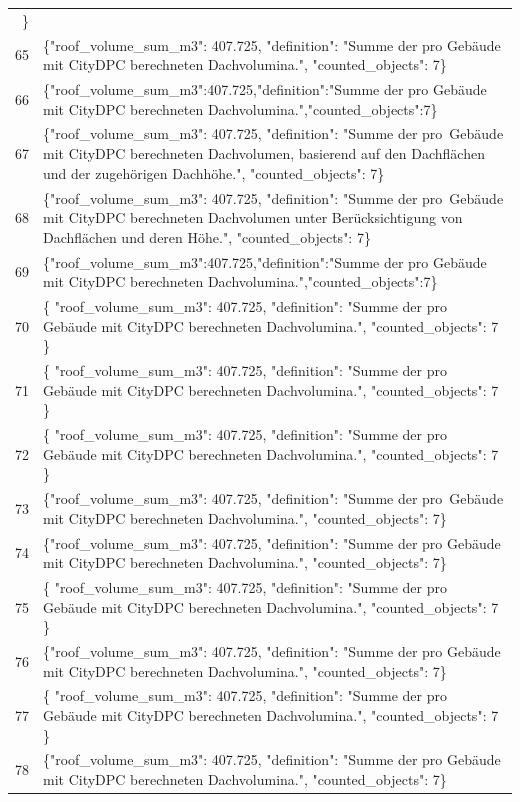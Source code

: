 \documentclass[a4paper,11pt]{article}
\begin{document}
\begin{table}[ht]
\begin{tabular}{r p{12cm}}
\} \\
65 & \{"roof\_volume\_sum\_m3": 407.725, "definition": "Summe der pro Gebäude mit CityDPC berechneten Dachvolumina.", "counted\_objects": 7\} \\
66 & \{"roof\_volume\_sum\_m3":407.725,"definition":"Summe der pro Gebäude mit CityDPC berechneten Dachvolumina.","counted\_objects":7\} \\
67 & \{"roof\_volume\_sum\_m3": 407.725, "definition": "Summe der pro Gebäude mit CityDPC berechnet­en Dachvolumen, basierend auf den Dachflächen und der zugehörigen Dachhöhe.", "counted\_objects": 7\} \\
68 & \{"roof\_volume\_sum\_m3": 407.725, "definition": "Summe der pro Gebäude mit CityDPC berechneten Dachvolumen unter Berücksichtigung von Dachflächen und deren Höhe.", "counted\_objects": 7\} \\
69 & \{"roof\_volume\_sum\_m3":407.725,"definition":"Summe der pro Gebäude mit CityDPC berechneten Dachvolumina.","counted\_objects":7\} \\
70 & \{
  "roof\_volume\_sum\_m3": 407.725,
  "definition": "Summe der pro Gebäude mit CityDPC berechneten Dachvolumina.",
  "counted\_objects": 7
\} \\
71 & \{
  "roof\_volume\_sum\_m3": 407.725,
  "definition": "Summe der pro Gebäude mit CityDPC berechneten Dachvolumina.",
  "counted\_objects": 7
\} \\
72 & \{
  "roof\_volume\_sum\_m3": 407.725,
  "definition": "Summe der pro Gebäude mit CityDPC berechneten Dachvolumina.",
  "counted\_objects": 7
\} \\
73 & \{"roof\_volume\_sum\_m3": 407.725, "definition": "Summe der pro Gebäude mit CityDPC berechneten Dachvolumina.", "counted\_objects": 7\} \\
74 & \{"roof\_volume\_sum\_m3": 407.725, "definition": "Summe der pro Gebäude mit CityDPC berechneten Dachvolumina.", "counted\_objects": 7\} \\
75 & \{
  "roof\_volume\_sum\_m3": 407.725,
  "definition": "Summe der pro Gebäude mit CityDPC berechneten Dachvolumina.",
  "counted\_objects": 7
\} \\
76 & \{"roof\_volume\_sum\_m3": 407.725, "definition": "Summe der pro Gebäude mit CityDPC berechneten Dachvolumina.", "counted\_objects": 7\} \\
77 & \{
  "roof\_volume\_sum\_m3": 407.725,
  "definition": "Summe der pro Gebäude mit CityDPC berechneten Dachvolumina.",
  "counted\_objects": 7
\} \\
78 & \{"roof\_volume\_sum\_m3": 407.725, "definition": "Summe der pro Gebäude mit CityDPC berechneten Dachvolumina.", "counted\_objects": 7\} \\

\end{tabular}
\end{table}
\end{document}
